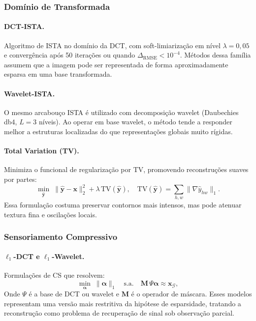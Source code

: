\subsubsection{Domínio de Transformada}

\paragraph{DCT-ISTA.}
Algoritmo de \gls{ISTA} no domínio da \gls{DCT}, com soft-limiarização em nível $\lambda{=}0{,}05$ e convergência após 50 iterações ou quando $\Delta_{\mathrm{RMSE}} < 10^{-4}$.
Métodos dessa família assumem que a imagem pode ser representada de forma aproximadamente esparsa em uma base transformada.

\paragraph{Wavelet-ISTA.}
O mesmo arcabouço \gls{ISTA} é utilizado com decomposição wavelet (Daubechies db4, $L{=}3$ níveis).
Ao operar em base wavelet, o método tende a responder melhor a estruturas localizadas do que representações globais muito rígidas.

\paragraph{Total Variation (TV).}
Minimiza o funcional de regularização por \gls{TV}, promovendo reconstruções suaves por partes:
\[
  \min_{\hat{\mathbf{y}}} \; \|\hat{\mathbf{y}} - \mathbf{x}\|_2^2
  + \lambda \, \mathrm{TV}(\hat{\mathbf{y}}),
  \quad
  \mathrm{TV}(\hat{\mathbf{y}}) = \sum_{h,w} \|\nabla \hat{y}_{hw}\|_1.
\]
Essa formulação costuma preservar contornos mais intensos, mas pode atenuar textura fina e oscilações locais.

\subsubsection{Sensoriamento Compressivo}

\paragraph{$\ell_1$-DCT e $\ell_1$-Wavelet.}
Formulações de \gls{CS} que resolvem:
\[
  \min_{\boldsymbol{\alpha}} \; \|\boldsymbol{\alpha}\|_1
  \quad \text{s.a.} \quad
  \mathbf{M} \, \Psi \boldsymbol{\alpha} \approx \mathbf{x}_{\mathcal{G}},
\]
Onde $\Psi$ é a base de \gls{DCT} ou wavelet e $\mathbf{M}$ é o operador de máscara.
Esses modelos representam uma versão mais restritiva da hipótese de esparsidade, tratando a reconstrução como problema de recuperação de sinal sob observação parcial.

